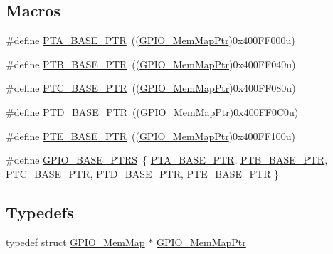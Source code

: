 \subsection*{Macros}
\begin{DoxyCompactItemize}
\item 
\#define \hyperlink{group___g_p_i_o___peripheral_gadf98f6ee2bbfd42102e378a66b29b9ef}{P\+T\+A\+\_\+\+B\+A\+S\+E\+\_\+\+P\+TR}~((\hyperlink{group___g_p_i_o___peripheral_ga31c1eddda45aa085f51142987e05ada5}{G\+P\+I\+O\+\_\+\+Mem\+Map\+Ptr})0x400\+F\+F000u)
\item 
\#define \hyperlink{group___g_p_i_o___peripheral_ga59ab0f28e891ea28f152505ce2021747}{P\+T\+B\+\_\+\+B\+A\+S\+E\+\_\+\+P\+TR}~((\hyperlink{group___g_p_i_o___peripheral_ga31c1eddda45aa085f51142987e05ada5}{G\+P\+I\+O\+\_\+\+Mem\+Map\+Ptr})0x400\+F\+F040u)
\item 
\#define \hyperlink{group___g_p_i_o___peripheral_gaaa3dc05c2a51a960067e1de6863fd3dd}{P\+T\+C\+\_\+\+B\+A\+S\+E\+\_\+\+P\+TR}~((\hyperlink{group___g_p_i_o___peripheral_ga31c1eddda45aa085f51142987e05ada5}{G\+P\+I\+O\+\_\+\+Mem\+Map\+Ptr})0x400\+F\+F080u)
\item 
\#define \hyperlink{group___g_p_i_o___peripheral_gaa61d2c33375f3becbae1353eee4c1317}{P\+T\+D\+\_\+\+B\+A\+S\+E\+\_\+\+P\+TR}~((\hyperlink{group___g_p_i_o___peripheral_ga31c1eddda45aa085f51142987e05ada5}{G\+P\+I\+O\+\_\+\+Mem\+Map\+Ptr})0x400\+F\+F0\+C0u)
\item 
\#define \hyperlink{group___g_p_i_o___peripheral_gaa230685f72ad1540850ab8d12366775c}{P\+T\+E\+\_\+\+B\+A\+S\+E\+\_\+\+P\+TR}~((\hyperlink{group___g_p_i_o___peripheral_ga31c1eddda45aa085f51142987e05ada5}{G\+P\+I\+O\+\_\+\+Mem\+Map\+Ptr})0x400\+F\+F100u)
\item 
\#define \hyperlink{group___g_p_i_o___peripheral_gad0f7206167a584b1e75a81a5c30fa1c2}{G\+P\+I\+O\+\_\+\+B\+A\+S\+E\+\_\+\+P\+T\+RS}~\{ \hyperlink{group___g_p_i_o___peripheral_gadf98f6ee2bbfd42102e378a66b29b9ef}{P\+T\+A\+\_\+\+B\+A\+S\+E\+\_\+\+P\+TR}, \hyperlink{group___g_p_i_o___peripheral_ga59ab0f28e891ea28f152505ce2021747}{P\+T\+B\+\_\+\+B\+A\+S\+E\+\_\+\+P\+TR}, \hyperlink{group___g_p_i_o___peripheral_gaaa3dc05c2a51a960067e1de6863fd3dd}{P\+T\+C\+\_\+\+B\+A\+S\+E\+\_\+\+P\+TR}, \hyperlink{group___g_p_i_o___peripheral_gaa61d2c33375f3becbae1353eee4c1317}{P\+T\+D\+\_\+\+B\+A\+S\+E\+\_\+\+P\+TR}, \hyperlink{group___g_p_i_o___peripheral_gaa230685f72ad1540850ab8d12366775c}{P\+T\+E\+\_\+\+B\+A\+S\+E\+\_\+\+P\+TR} \}
\end{DoxyCompactItemize}
\subsection*{Typedefs}
\begin{DoxyCompactItemize}
\item 
typedef struct \hyperlink{struct_g_p_i_o___mem_map}{G\+P\+I\+O\+\_\+\+Mem\+Map} $\ast$ \hyperlink{group___g_p_i_o___peripheral_ga31c1eddda45aa085f51142987e05ada5}{G\+P\+I\+O\+\_\+\+Mem\+Map\+Ptr}
\end{DoxyCompactItemize}


